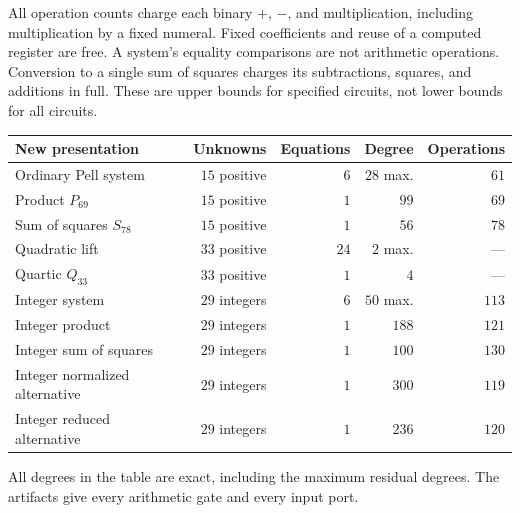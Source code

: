 \documentclass[11pt,a4paper]{article}
\theoremstyle{remark}\newtheorem{remark}[theorem]{Remark}
\begin{document}
All operation counts charge each binary $+$, $-$, and multiplication,
including multiplication by a fixed numeral. Fixed coefficients and
reuse of a computed register are free. A system's equality comparisons
are not arithmetic operations. Conversion to a single sum of squares
charges its subtractions, squares, and additions in full. These are
upper bounds for specified circuits, not lower bounds for all circuits.

\begin{center}\small
\begin{tabular}{lrrrr}
\toprule
New presentation & Unknowns & Equations & Degree & Operations\\
\midrule
Ordinary Pell system & $15$ positive & $6$ & $28$ max. & $61$\\
Product $P_{69}$ & $15$ positive & $1$ & $99$ & $69$\\
Sum of squares $S_{78}$ & $15$ positive & $1$ & $56$ & $78$\\
Quadratic lift & $33$ positive & $24$ & $2$ max. & ---\\
Quartic $Q_{33}$ & $33$ positive & $1$ & $4$ & ---\\
Integer system & $29$ integers & $6$ & $50$ max. & $113$\\
Integer product & $29$ integers & $1$ & $188$ & $121$\\
Integer sum of squares & $29$ integers & $1$ & $100$ & $130$\\
Integer normalized alternative & $29$ integers & $1$ & $300$ & $119$\\
Integer reduced alternative & $29$ integers & $1$ & $236$ & $120$\\
\bottomrule
\end{tabular}
\end{center}
All degrees in the table are exact, including the maximum residual
degrees. The artifacts give every arithmetic gate and every input port.
\end{document}
